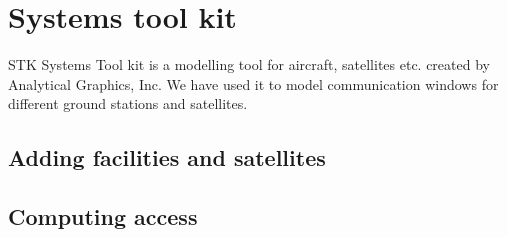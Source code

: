 \section{Systems tool kit}
STK Systems Tool kit is a modelling tool for aircraft, satellites etc. created by Analytical Graphics, Inc.  We have used it to model communication windows for different ground stations and satellites.
\subsection{Adding facilities and satellites}
\subsection{Computing access}